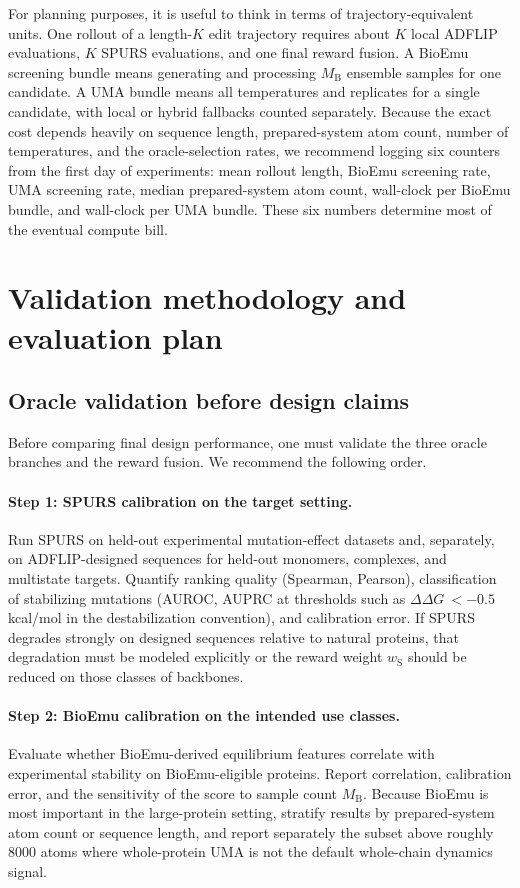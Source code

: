 \documentclass[11pt]{article}
\newcommand{\ddG}{\ensuremath{\Delta\Delta G \ }}
\begin{document}
	For planning purposes, it is useful to think in terms of trajectory-equivalent units. One rollout of a length-$K$ edit trajectory requires about $K$ local ADFLIP evaluations, $K$ SPURS evaluations, and one final reward fusion. A BioEmu screening bundle means generating and processing $M_{\mathrm B}$ ensemble samples for one candidate. A UMA bundle means all temperatures and replicates for a single candidate, with local or hybrid fallbacks counted separately. Because the exact cost depends heavily on sequence length, prepared-system atom count, number of temperatures, and the oracle-selection rates, we recommend logging six counters from the first day of experiments: mean rollout length, BioEmu screening rate, UMA screening rate, median prepared-system atom count, wall-clock per BioEmu bundle, and wall-clock per UMA bundle. These six numbers determine most of the eventual compute bill.
	
	
	
	\section{Validation methodology and evaluation plan}
	\label{sec:eval}
	
	\subsection{Oracle validation before design claims}
	
	Before comparing final design performance, one must validate the three oracle branches and the reward fusion. We recommend the following order.
	
	\paragraph{Step 1: SPURS calibration on the target setting.}
	Run SPURS on held-out experimental mutation-effect datasets and, separately, on ADFLIP-designed sequences for held-out monomers, complexes, and multistate targets. Quantify ranking quality (Spearman, Pearson), classification of stabilizing mutations (AUROC, AUPRC at thresholds such as $\ddG<-0.5$ kcal/mol in the destabilization convention), and calibration error. If SPURS degrades strongly on designed sequences relative to natural proteins, that degradation must be modeled explicitly or the reward weight $w_{\mathrm S}$ should be reduced on those classes of backbones.
	
	\paragraph{Step 2: BioEmu calibration on the intended use classes.}
	Evaluate whether BioEmu-derived equilibrium features correlate with experimental stability on BioEmu-eligible proteins. Report correlation, calibration error, and the sensitivity of the score to sample count $M_{\mathrm B}$. Because BioEmu is most important in the large-protein setting, stratify results by prepared-system atom count or sequence length, and report separately the subset above roughly $8000$ atoms where whole-protein UMA is not the default whole-chain dynamics signal.
	
\end{document}
